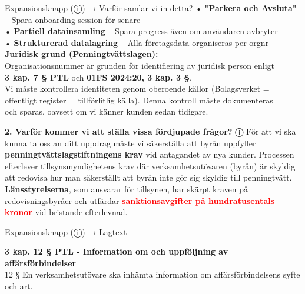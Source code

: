 \documentclass[10pt]{beamer}
\begin{document}
\begin{frame}[label=intro]
\begin{alertblock}{Expansionsknapp (ⓘ) → Varför samlar vi in detta?}
    \tiny • \textbf{"Parkera och Avsluta"} – Spara onboarding-session för senare\\[0.1cm]
    \tiny • \textbf{Partiell datainsamling} – Spara progress även om användaren avbryter\\[0.1cm]
    \tiny • \textbf{Strukturerad datalagring} – Alla företagsdata organiseras per orgnr\\[0.2cm]
    
    \tiny \textbf{Juridisk grund (Penningtvättslagen):}\\[0.1cm]
    \tiny Organisationsnummer är grunden för identifiering av juridisk person enligt\\[0.1cm]
    \tiny \textbf{3 kap. 7 § PTL} och \textbf{01FS 2024:20, 3 kap. 3 §}.\\[0.2cm]
    
    \tiny Vi måste kontrollera identiteten genom oberoende källor (Bolagsverket =\\[0.1cm]
    \tiny offentligt register = tillförlitlig källa). Denna kontroll måste dokumenteras\\[0.1cm]
    \tiny och sparas, oavsett om vi känner kunden sedan tidigare.
  \end{alertblock}
  
  \vspace{0.5cm}
  
  \begin{block}{\textbf{2. Varför kommer vi att ställa vissa fördjupade frågor?} \hspace{0.3cm} ⓘ}
    \footnotesize
    För att vi ska kunna ta oss an ditt uppdrag måste vi säkerställa att byrån uppfyller \textbf{penningtvättslagstiftningens krav} vid antagandet av nya kunder. Processen efterlever tillsynsmyndighetens krav där verksamhetsutövaren (byrån) är skyldig att redovisa hur man säkerställt att byrån inte gör sig skyldig till penningtvätt.\\
    \vspace{0.2cm}
    \textbf{Länsstyrelserna}, som ansvarar för tillsynen, har skärpt kraven på redovisningsbyråer och utfärdar \textcolor{red}{\textbf{sanktionsavgifter på hundratusentals kronor}} vid bristande efterlevnad.
  \end{block}
  
  \begin{alertblock}{Expansionsknapp (ⓘ) → Lagtext}

    \tiny \textbf{ 3 kap. 12 § PTL - Information om och uppföljning av affärsförbindelser} \\
    \tiny 12 §   En verksamhetsutövare ska inhämta information om affärsförbindelsens syfte och art.\\


\end{alertblock}
\end{frame}
\end{document}
